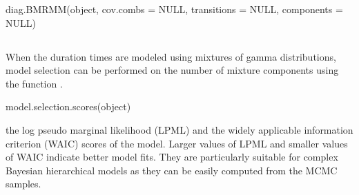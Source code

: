 \begin{example}
diag.BMRMM(object, cov.combs = NULL, transitions = NULL, components = NULL) 
\end{example}

\subsection{}
When the {duration times} are modeled using mixtures of gamma distributions, model selection can be performed on the number of mixture components using the function .

\begin{example}
model.selection.scores(object) 
\end{example}

 the log pseudo marginal likelihood (LPML)  \citep{geisser1979predictive} and the widely applicable information criterion (WAIC) \citep{watanabe2010asymptotic} scores of the model.  
Larger values of LPML and smaller values of WAIC indicate better model fits.
They are particularly suitable for complex Bayesian hierarchical models as they can be easily computed from the MCMC samples. 






